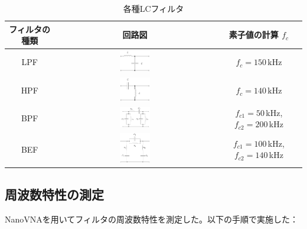 \documentclass[11pt,dvipdfmx]{jarticle}
\begin{document}
\begin{table}[H]
  \centering
  \caption{各種LCフィルタ}
  \label{tab:各種LCフィルタ}
  \begin{tabular}{|c|c|c|}
    \hline
    フィルタの種類 & 回路図 & 素子値の計算 $f_c$ \\
    \hline
    LPF & \includegraphics[width=0.2\textwidth]{fig/LPF.drawio.png} & $f_c = 150\,\mathrm{kHz}$ \\
    HPF & \includegraphics[width=0.2\textwidth]{fig/HPF.drawio.png} & $f_c = 140\,\mathrm{kHz}$ \\
    BPF & \includegraphics[width=0.2\textwidth]{fig/BPF.drawio.png} & $f_{c1} = 50\,$kHz,$f_{c2} = 200\,$kHz \\
    BEF & \includegraphics[width=0.2\textwidth]{fig/BEF.drawio.png} & $f_{c1} = 100\,$kHz,$f_{c2} = 140\,$kHz \\
    \hline
  \end{tabular}
\end{table}
\subsection{周波数特性の測定}
NanoVNAを用いてフィルタの周波数特性を測定した。以下の手順で実施した：
\end{document}
